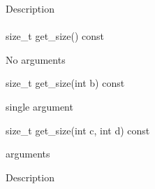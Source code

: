 \documentclass[letterpaper,10pt,english]{sphinxmanual}
\begin{document}
Description


\paragraph{}
\label{\detokenize{programming-interface/data/accessor:get-count}}\begin{sphinxalltt}
size\_t get\_size() const \begin{footnote}[1]\sphinxAtStartFootnote
No arguments
\end{footnote}
size\_t get\_size(int b) const \begin{footnote}[2]\sphinxAtStartFootnote
single argument
\end{footnote}
size\_t get\_size(int c, int d) const \begin{footnote}[3] arguments
\end{footnote}
\end{sphinxalltt}

Description
\end{document}
